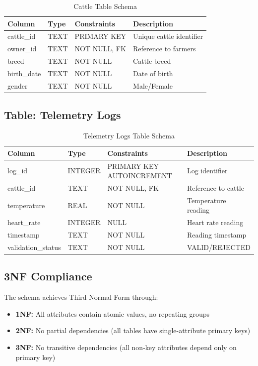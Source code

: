 \begin{table}[H]
\centering
\begin{tabular}{|l|l|l|l|}
\hline
\textbf{Column} & \textbf{Type} & \textbf{Constraints} & \textbf{Description} \\
\hline
cattle\_id & TEXT & PRIMARY KEY & Unique cattle identifier \\
owner\_id & TEXT & NOT NULL, FK & Reference to farmers \\
breed & TEXT & NOT NULL & Cattle breed \\
birth\_date & TEXT & NOT NULL & Date of birth \\
gender & TEXT & NOT NULL & Male/Female \\
\hline
\end{tabular}
\caption{Cattle Table Schema}
\end{table}

\subsection{Table: Telemetry Logs}

\begin{table}[H]
\centering
\begin{tabular}{|l|l|l|l|}
\hline
\textbf{Column} & \textbf{Type} & \textbf{Constraints} & \textbf{Description} \\
\hline
log\_id & INTEGER & PRIMARY KEY AUTOINCREMENT & Log identifier \\
cattle\_id & TEXT & NOT NULL, FK & Reference to cattle \\
temperature & REAL & NOT NULL & Temperature reading \\
heart\_rate & INTEGER & NULL & Heart rate reading \\
timestamp & TEXT & NOT NULL & Reading timestamp \\
validation\_status & TEXT & NOT NULL & VALID/REJECTED \\
\hline
\end{tabular}
\caption{Telemetry Logs Table Schema}
\end{table}

\subsection{3NF Compliance}

The schema achieves Third Normal Form through:

\begin{itemize}
    \item \textbf{1NF:} All attributes contain atomic values, no repeating groups
    \item \textbf{2NF:} No partial dependencies (all tables have single-attribute primary keys)
    \item \textbf{3NF:} No transitive dependencies (all non-key attributes depend only on primary key)
\end{itemize}

